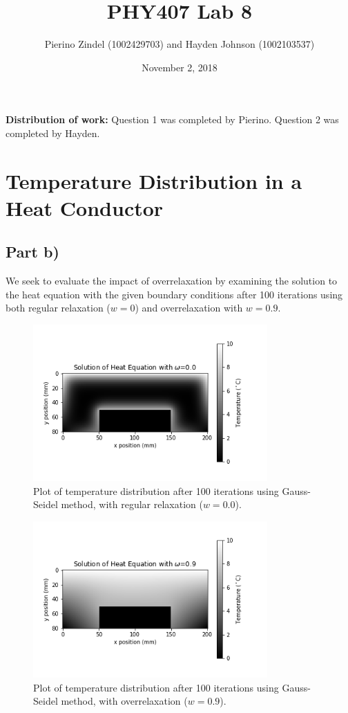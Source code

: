\documentclass{article}
\title{PHY407 Lab 8}
\author{Pierino Zindel (1002429703) and Hayden Johnson (1002103537)}
\date{November 2, 2018}
\begin{document}
\maketitle

\noindent \textbf{Distribution of work:} Question 1 was completed by Pierino. Question 2 was completed by Hayden.

\section{Temperature Distribution in a Heat Conductor}

\subsection{Part b)}

We seek to evaluate the impact of overrelaxation by examining the solution to the heat equation with the given boundary conditions after 100 iterations using both regular relaxation ($w=0$) and overrelaxation with $w=0.9$. 

\begin{figure}[H]
	\centering
	\includegraphics[width=0.8\textwidth]{../images/q1_b_0p0.png}
	\caption{Plot of temperature distribution after 100 iterations using Gauss-Seidel method, with regular relaxation ($w=0.0$).}
	\label{fig:1b_w=0.0}
\end{figure}

\begin{figure}[H]
	\centering
	\includegraphics[width=0.8\textwidth]{../images/q1_b_0p9.png}
	\caption{Plot of temperature distribution after 100 iterations using Gauss-Seidel method, with overrelaxation ($w=0.9$).}
	\label{fig:1b_w=0.9}
\end{figure}
\end{document}

